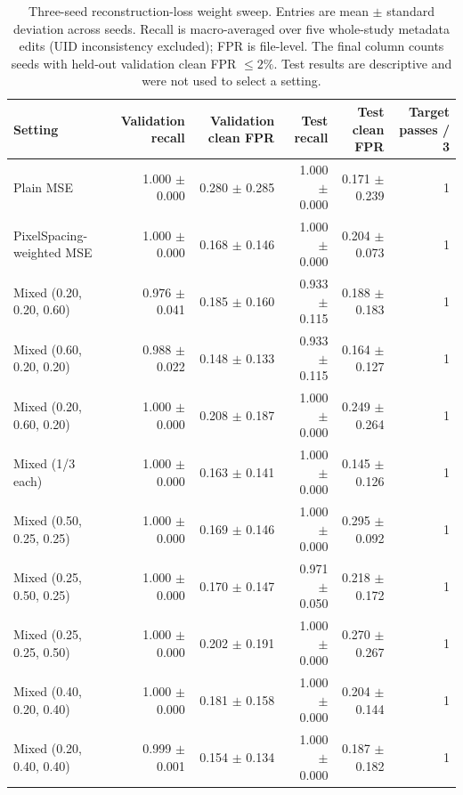 \documentclass[journal]{IEEEtran}
\begin{document}
  \begin{table}[t]
  \caption{Three-seed reconstruction-loss weight sweep. Entries are mean $\pm$ standard deviation across seeds. Recall is macro-averaged over five whole-study metadata edits (UID inconsistency excluded); FPR is file-level. The final column counts seeds with held-out validation clean FPR $\leq2\%$. Test results are descriptive and were not used to select a setting.}
  \label{tab:ae_weight_sweep}
  \centering\scriptsize
  \setlength{\tabcolsep}{4pt}
  \begin{tabular}{lrrrrr}
  \toprule
  Setting & Validation recall & Validation clean FPR & Test recall & Test clean FPR & Target passes / 3 \\
  \midrule
  Plain MSE & 1.000 $\pm$ 0.000 & 0.280 $\pm$ 0.285 & 1.000 $\pm$ 0.000 & 0.171 $\pm$ 0.239 & 1 \\
  PixelSpacing-weighted MSE & 1.000 $\pm$ 0.000 & 0.168 $\pm$ 0.146 & 1.000 $\pm$ 0.000 & 0.204 $\pm$ 0.073 & 1 \\
  Mixed (0.20, 0.20, 0.60) & 0.976 $\pm$ 0.041 & 0.185 $\pm$ 0.160 & 0.933 $\pm$ 0.115 & 0.188 $\pm$ 0.183 & 1 \\
  Mixed (0.60, 0.20, 0.20) & 0.988 $\pm$ 0.022 & 0.148 $\pm$ 0.133 & 0.933 $\pm$ 0.115 & 0.164 $\pm$ 0.127 & 1 \\
  Mixed (0.20, 0.60, 0.20) & 1.000 $\pm$ 0.000 & 0.208 $\pm$ 0.187 & 1.000 $\pm$ 0.000 & 0.249 $\pm$ 0.264 & 1 \\
  Mixed (1/3 each) & 1.000 $\pm$ 0.000 & 0.163 $\pm$ 0.141 & 1.000 $\pm$ 0.000 & 0.145 $\pm$ 0.126 & 1 \\
  Mixed (0.50, 0.25, 0.25) & 1.000 $\pm$ 0.000 & 0.169 $\pm$ 0.146 & 1.000 $\pm$ 0.000 & 0.295 $\pm$ 0.092 & 1 \\
  Mixed (0.25, 0.50, 0.25) & 1.000 $\pm$ 0.000 & 0.170 $\pm$ 0.147 & 0.971 $\pm$ 0.050 & 0.218 $\pm$ 0.172 & 1 \\
  Mixed (0.25, 0.25, 0.50) & 1.000 $\pm$ 0.000 & 0.202 $\pm$ 0.191 & 1.000 $\pm$ 0.000 & 0.270 $\pm$ 0.267 & 1 \\
  Mixed (0.40, 0.20, 0.40) & 1.000 $\pm$ 0.000 & 0.181 $\pm$ 0.158 & 1.000 $\pm$ 0.000 & 0.204 $\pm$ 0.144 & 1 \\
  Mixed (0.20, 0.40, 0.40) & 0.999 $\pm$ 0.001 & 0.154 $\pm$ 0.134 & 1.000 $\pm$ 0.000 & 0.187 $\pm$ 0.182 & 1 \\
  \bottomrule
  \end{tabular}
  \end{table}
\end{document}
